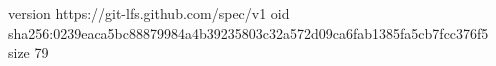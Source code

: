 version https://git-lfs.github.com/spec/v1
oid sha256:0239eaca5bc88879984a4b39235803c32a572d09ca6fab1385fa5cb7fcc376f5
size 79
